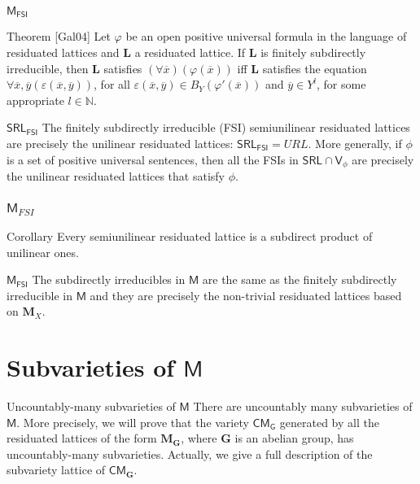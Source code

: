 \documentclass[professionalfont, 10pt]{beamer} %
\theoremstyle{plain}
\theoremstyle{definition}
\newcommand{\m}[1]{{\mathbf {#1} }}
\newcommand{\bb}[1]{\mathbb {#1}}
\begin{document}
\begin{frame}{$\mathsf{M_{FSI}}$}
    \begin{block}{Theorem [Gal04]}
        Let $\varphi$ be an open positive universal formula in the language of residuated lattices and $\m L$ a residuated lattice.
        If $\m L$ is finitely subdirectly irreducible, then $\m L$ satisfies $(\forall \overline{x})(\varphi(\overline{x}))$ iff $\m L$ satisfies the equation $\forall \overline{x}, \overline{y} (\varepsilon(\overline{x}, \overline{y}))$, for all $\varepsilon(\overline{x}, \overline{y}) \in B_Y(\varphi'(\overline{x}))$ and $\overline{y} \in Y^l$, for some appropriate $l \in \bb{N}$.
    \end{block}
    \pause
    
    \begin{block}{$\mathsf{SRL_{FSI}}$}
        The finitely subdirectly irreducible (FSI) semiunilinear residuated lattices are precisely the unilinear residuated lattices: $\mathsf{SRL_{FSI}} = URL$.
        More generally, if $\phi$ is a set of positive universal sentences, then all the FSIs in  $\mathsf{SRL} \cap \mathsf{V}_\phi$ are precisely the unilinear residuated lattices that satisfy $\phi$.
    \end{block}
\end{frame}

\begin{frame}
\frametitle{$\mathsf{M}_{FSI}$}
\begin{block}{Corollary}
        Every semiunilinear residuated lattice is a subdirect product of unilinear ones.
    \end{block}

    \pause

    \begin{block}{$\mathsf{M_{FSI}}$}
        The subdirectly irreducibles in $\mathsf{M}$ are the same as the finitely subdirectly irreducible in $\mathsf{M}$ and they are precisely the non-trivial residuated lattices based on $\mathbf{M}_X$.
    \end{block}    
\end{frame}

\section{Subvarieties of $\mathsf{M}$}

\begin{frame}{Uncountably-many subvarieties of $\mathsf{M}$}
There are uncountably many subvarieties of $\mathsf{M}$. \pause
More precisely, we will prove that the variety $\mathsf{CM_G}$ generated by all the residuated lattices of the form $\mathbf{M}_{\mathbf{G}}$, where $\mathbf{G}$ is an abelian group, has uncountably-many subvarieties.
Actually, we give a full description of the subvariety lattice of $\mathsf{CM}_{\mathbf{G}}$.
\end{frame}
\end{document}
